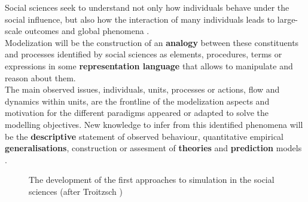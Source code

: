 \documentclass[11pt,oneside,a4paper,openright]{report}
\begin{document}
Social sciences seek to understand not only how individuals behave under the social influence, but also how the interaction of many individuals leads to large-scale outcomes and global phenomena \cite[p.9]{GordonBurt2010}.\\ 
Modelization will be the construction of an \textbf{analogy} between these constituents and processes identified by social sciences as elements, procedures, terms or expressions in some \textbf{representation language} that allows to manipulate and reason about them.\\  
The main observed issues, individuals, units, processes or actions, flow and dynamics within units, are the frontline of the 
modelization aspects and motivation for the different paradigms appeared or adapted to solve the modelling objectives. New 
knowledge to infer from this identified phenomena will be the \textbf{descriptive} statement of observed behaviour, quantitative 
empirical \textbf{generalisations}, construction or assesment of \textbf{theories} and \textbf{prediction} models \cite[p.9-53]{Coleman1964}.


\begin{figure}[h]
\centering
\setlength\fboxsep{0pt}
\setlength\fboxrule{0.5pt}
\caption{The development of the first approaches to simulation in the social sciences (after Troitzsch \cite{GilbertTroitzsch})}
\label{fig:SimAppGilbTro}
\end{figure}

\end{document}
